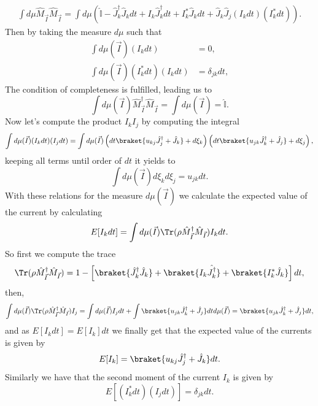 \begin{align*}
\int d\mu \hat{M}_{\vec{I}}\hat{M}_{\vec{I}}=\int d\mu \left(\hat{\mathbb{I}}-\hat{J}^{\dagger}_{k}\hat{J}_{k}dt+I_{k}\hat{J}_{k}^{\dagger}dt+I^{*}_{k}\hat{J}_{k}dt+\hat{J}_{k}\hat{J}_{j}(I_k dt)(I^{*}_k dt)\right).
\end{align*}
Then by taking the measure $d\mu$ such that
\begin{align}
\int d\mu(\vec{I})(I_k dt)&=0,\label{1conditionmu}\\
\int d\mu(\vec{I})(I^{*}_k dt)(I_{k} dt)&=\delta_{jk}dt,\label{2conditionmu}
\end{align}
The condition of completeness is fulfilled, leading us to
\[
\int d\mu(\vec{I}) \hat{M}^{\dagger}_{\vec{I}}\hat{M}_{\vec{I}}=\int d\mu (\vec{I})=\hat{\mathbb{I}}.
\]
Now let's compute the product $I_k I_j$ by computing the integral
\[\int d\mu(\vec{I})(I_k dt)(I_j dt)=\int d\mu(\vec{I}) \left(dt\braket{u_{kj}\hat{J}_{j}^{\dagger}+\hat{J}_{k}}+d\xi_k\right)\left(dt\braket{u_{jk}\hat{J}_{k}^{\dagger}+\hat{J}_{j}}+d\xi_{j}\right),\]  
keeping all terms until order of $dt$ it yields to
\begin{equation}
\int d\mu(\vec{I}) d\xi_{k}d\xi_{j}=u_{jk}dt.
\label{3conditionmu}
\end{equation}
With these relations for the measure $d\mu(\vec{I})$ we calculate the expected value of the current by calculating 
\begin{align*}
E[I_k dt]=\int d\mu(\vec{I})\Tr(\rho\hat{M}^{\dagger}_{\vec{I}}\hat{M}_{\vec{I}})I_k dt.
\end{align*}
So first we compute the trace
\begin{equation}
\Tr(\rho\hat{M}^{\dagger}_{\vec{I}}\hat{M}_{\vec{I}})=1-\left[\braket{\hat{J}^{\dagger}_{k}\hat{J}_k}+\braket{I_k\hat{J^{\dagger}_k}}+\braket{I^{*}_{k}\hat{J}_k}\right]dt,
\label{tracecurrent}
\end{equation} 
then,
\[\int d\mu(\vec{I}) \Tr(\rho\hat{M}^{\dagger}_{\vec{I}}\hat{M}_{\vec{I}})I_j=\int d \mu(\vec{I}) I_j dt +\int \braket{u_{jk}\hat{J}_{k}^{\dagger}+\hat{J}_{j}}dt d\mu(\vec{I})=\braket{u_{jk}\hat{J}_{k}^{\dagger}+\hat{J}_{j}}dt,\]
and as $E[I_k dt]=E[I_k]dt$ we finally get that the expected value of the currents is given by
\begin{equation}
E[I_k]=\braket{u_{kj}\hat{J}_{j}^{\dagger}+\hat{J}_{k}}dt.
\label{averagecurrent}
\end{equation} 
Similarly we have that the second moment of the current $I_k$ is given by
\begin{equation}
E[(I^{*}_{k}dt)(I_{j}dt)]=\delta_{jk}dt.
\label{secondmomentcurrent}
\end{equation}
